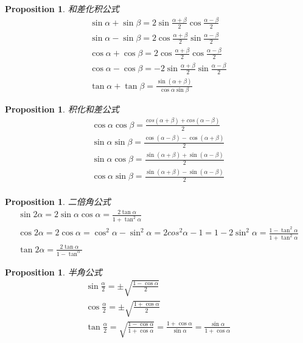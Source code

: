 \documentclass{article}
\newtheorem{proposition}[theorem]{Proposition}
\begin{document}
\begin{proposition}
\rm 和差化积公式
$$
\begin{array}{ll}
\sin \alpha + \sin \beta = 2\sin\frac{\alpha + \beta}{2}\cos\frac{\alpha - \beta}{2} \\
\sin \alpha - \sin \beta = 2\cos\frac{\alpha + \beta}{2}\sin\frac{\alpha - \beta}{2} \\
\cos \alpha + \cos \beta = 2\cos\frac{\alpha + \beta}{2}\cos\frac{\alpha - \beta}{2} \\
\cos \alpha - \cos \beta = - 2\sin\frac{\alpha + \beta}{2}\sin\frac{\alpha - \beta}{2} \\
\tan \alpha + \tan \beta = \frac{\sin (\alpha + \beta)}{\cos \alpha \sin \beta} 
\end{array}
$$
\end{proposition}

\begin{proposition}
\rm 积化和差公式
$$
\begin{array}{ll}
\cos\alpha \cos\beta = \frac{cos(\alpha+\beta)+cos(\alpha-\beta)}{2} \\
\sin\alpha \sin\beta = \frac{\cos(\alpha-\beta)-\cos(\alpha+\beta)}{2} \\ 
\sin\alpha \cos\beta = \frac{\sin(\alpha+\beta)+\sin(\alpha-\beta)}{2} \\
\cos\alpha \sin\beta = \frac{\sin(\alpha+\beta)-\sin(\alpha-\beta)}{2} \\ 
\end{array}
$$
\end{proposition}

\begin{proposition}
\rm 二倍角公式
$$
\begin{array}{ll}
\sin 2\alpha = 2\sin \alpha \cos \alpha = \frac{2\tan \alpha}{1 + \tan^2 \alpha}\\
\cos 2\alpha = 2\cos \alpha = \cos^2 \alpha - \sin^2 \alpha =  2cos^2\alpha - 1 = 1 - 2\sin^2 \alpha  = \frac{1-\tan^2 \alpha}{1 + \tan^2\alpha}\\
\tan 2\alpha = \frac{2\tan\alpha}{1-\tan^\alpha}
\end{array}
$$
\end{proposition}

\begin{proposition}
\rm 半角公式
$$
\begin{array}{ll}
\sin\frac{\alpha}{2} = \pm \sqrt{\frac{1-\cos \alpha}{2}} \\
\cos\frac{\alpha}{2} = \pm \sqrt{\frac{1+\cos \alpha}{2}} \\
\tan\frac{\alpha}{2} = \sqrt{\frac{1-\cos \alpha}{1+\cos \alpha}} = \frac{1+\cos \alpha}{\sin \alpha} = \frac{\sin \alpha}{1+\cos \alpha}\\
\end{array}
$$
\end{proposition}
\end{document}

